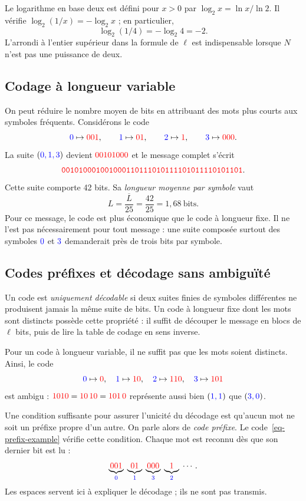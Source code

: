 Le logarithme en base deux est défini pour $x>0$ par $\log_2x=\ln x/\ln2$. Il vérifie $\log_2(1/x)=-\log_2x$ ; en particulier,
\[
 \log_2(1/4)=-\log_2 4=-2.
\]
L'arrondi à l'entier supérieur dans la formule de $\ell$ est indispensable lorsque $N$ n'est pas une puissance de deux.

\subsection{Codage à longueur variable}
On peut réduire le nombre moyen de bits en attribuant des mots plus courts aux symboles fréquents. Considérons le code
\begin{equation}\label{eq-prefix-example}
 {\color{blue}{0}}\mapsto{\color{red}{001}},\qquad {\color{blue}{1}}\mapsto{\color{red}{01}},\qquad
 {\color{blue}{2}}\mapsto{\color{red}{1}},\qquad {\color{blue}{3}}\mapsto{\color{red}{000}}.
\end{equation}
La suite $({\color{blue}{0,1,3}})$ devient ${\color{red}{00101000}}$ et le message complet s'écrit
\[
 {\color{red}{\mathtt{001010001001000110111010111101011110101101}}}.
\]
Cette suite comporte 42 bits. Sa \emph{longueur moyenne par symbole} vaut
\[
 L=\frac{\overline{L}}{25}=\frac{42}{25}=1{,}68\ \text{bits}.
\]
Pour ce message, le code est plus économique que le code à longueur fixe. Il ne l'est pas nécessairement pour tout message : une suite composée surtout des symboles ${\color{blue}{0}}$ et ${\color{blue}{3}}$ demanderait près de trois bits par symbole.

\subsection{Codes préfixes et décodage sans ambiguïté}
Un code est \emph{uniquement décodable} si deux suites finies de symboles différentes ne produisent jamais la même suite de bits. Un code à longueur fixe dont les mots sont distincts possède cette propriété : il suffit de découper le message en blocs de $\ell$ bits, puis de lire la table de codage en sens inverse.

Pour un code à longueur variable, il ne suffit pas que les mots soient distincts. Ainsi, le code
\[
 {\color{blue}{0}}\mapsto{\color{red}{0}},\quad {\color{blue}{1}}\mapsto{\color{red}{10}},\quad
 {\color{blue}{2}}\mapsto{\color{red}{110}},\quad {\color{blue}{3}}\mapsto{\color{red}{101}}
\]
est ambigu : ${\color{red}{1010}}={\color{red}{10}}\,{\color{red}{10}}={\color{red}{101}}\,{\color{red}{0}}$ représente aussi bien $({\color{blue}{1,1}})$ que $({\color{blue}{3,0}})$.

Une condition suffisante pour assurer l'unicité du décodage est qu'aucun mot ne soit un préfixe propre d'un autre. On parle alors de \emph{code préfixe}. Le code~\eqref{eq-prefix-example} vérifie cette condition. Chaque mot est reconnu dès que son dernier bit est lu :
\[
 \underbrace{{\color{red}{001}}}_{{\color{blue}{0}}}\;
 \underbrace{{\color{red}{01}}}_{{\color{blue}{1}}}\;
 \underbrace{{\color{red}{000}}}_{{\color{blue}{3}}}\;
 \underbrace{{\color{red}{1}}}_{{\color{blue}{2}}}\;\cdots.
\]
Les espaces servent ici à expliquer le décodage ; ils ne sont pas transmis.

